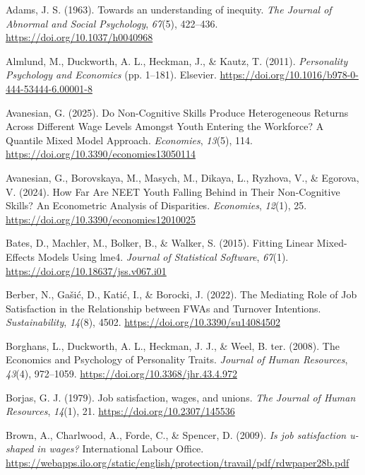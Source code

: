 \documentclass[
]{interact}
\newlength{\cslhangindent}
\newenvironment{CSLReferences}[2] %
 {\begin{list}{}{%
  \setlength{\itemindent}{0pt}
  \setlength{\leftmargin}{0pt}
  \setlength{\parsep}{0pt}
  \ifodd #1
   \setlength{\leftmargin}{\cslhangindent}
   \setlength{\itemindent}{-1\cslhangindent}
  \fi
  \setlength{\itemsep}{#2\baselineskip}}}
 {\end{list}}
\begin{document}
\begin{CSLReferences}{1}{0}
Adams, J. S. (1963). Towards an understanding of inequity. \emph{The
Journal of Abnormal and Social Psychology}, \emph{67}(5), 422--436.
\url{https://doi.org/10.1037/h0040968}

Almlund, M., Duckworth, A. L., Heckman, J., \& Kautz, T. (2011).
\emph{Personality Psychology and Economics} (pp. 1--181). Elsevier.
\url{https://doi.org/10.1016/b978-0-444-53444-6.00001-8}

Avanesian, G. (2025). Do Non-Cognitive Skills Produce Heterogeneous
Returns Across Different Wage Levels Amongst Youth Entering the
Workforce? A Quantile Mixed Model Approach. \emph{Economies},
\emph{13}(5), 114. \url{https://doi.org/10.3390/economies13050114}

Avanesian, G., Borovskaya, M., Masych, M., Dikaya, L., Ryzhova, V., \&
Egorova, V. (2024). How Far Are NEET Youth Falling Behind in Their
Non-Cognitive Skills? An Econometric Analysis of Disparities.
\emph{Economies}, \emph{12}(1), 25.
\url{https://doi.org/10.3390/economies12010025}

Bates, D., Machler, M., Bolker, B., \& Walker, S. (2015). Fitting Linear
Mixed-Effects Models Using lme4. \emph{Journal of Statistical Software},
\emph{67}(1). \url{https://doi.org/10.18637/jss.v067.i01}

Berber, N., Gašić, D., Katić, I., \& Borocki, J. (2022). The Mediating
Role of Job Satisfaction in the Relationship between FWAs and Turnover
Intentions. \emph{Sustainability}, \emph{14}(8), 4502.
\url{https://doi.org/10.3390/su14084502}

Borghans, L., Duckworth, A. L., Heckman, J. J., \& Weel, B. ter. (2008).
The Economics and Psychology of Personality Traits. \emph{Journal of
Human Resources}, \emph{43}(4), 972--1059.
\url{https://doi.org/10.3368/jhr.43.4.972}

Borjas, G. J. (1979). Job satisfaction, wages, and unions. \emph{The
Journal of Human Resources}, \emph{14}(1), 21.
\url{https://doi.org/10.2307/145536}

Brown, A., Charlwood, A., Forde, C., \& Spencer, D. (2009). \emph{Is job
satisfaction u-shaped in wages?} International Labour Office.
\url{https://webapps.ilo.org/static/english/protection/travail/pdf/rdwpaper28b.pdf}


\end{CSLReferences}
\end{document}
